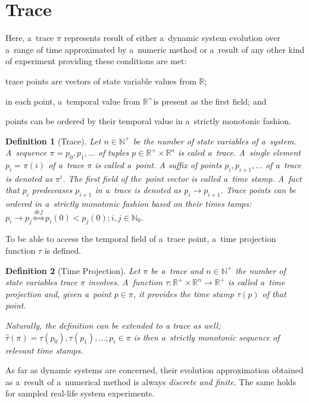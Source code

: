 \documentclass[12pt,oneside,draft]{fithesis}
\newcommand{\mReal}{\mathbb{R}}
\newcommand{\mNatural}{\mathbb{N}}
\newtheorem{mydef}{Definition}
\begin{document}
\section{Trace}
Here, a~trace $\pi$ represents result of either a~dynamic system
evolution over a~range of time\cite{sven}\cite{pospisil} approximated by
a~numeric method or a~result of any other kind of experiment providing
these conditions are met:
\begin{inparaenum}
	\item trace points are vectors of state variable values from
		$\mReal$;
	\item in each point, a~temporal value from $\mReal^+$is present
		as the first field; and
	\item points can be ordered by their temporal value in a~strictly
		monotonic fashion.
\end{inparaenum}
\begin{mydef}[Trace]
Let $n\in\mNatural^+$ be the number of state variables of a~system.
A~sequence $\pi=p_0,p_1,\dotsc$ of tuples $p\in\mReal^+\times\mReal^n$
is caled a~trace. A~single element $p_i=\pi(i)$ of a~trace $\pi$ is
called a~point.
A suffix of points $p_i,p_{i+1},\dotsc$ of a~trace is
denoted as $\pi^i$. The first field of the~point vector is called
a~time stamp.
A~fact that $p_i$ predeceases $p_{i+1}$ in a~trace is denoted as
$p_i\rightarrow p_{i+1}$. Trace points can be ordered in a~strictly
monotonic fashion based on their times tamps:
$p_i\rightarrow p_j\overset{def}{\iff} p_i(0)<p_j(0);i,j\in\mNatural_0$.
\end{mydef}

To be able to access the temporal field of a~trace point,
a~time projection function $\tau$ is defined.
\begin{mydef}[Time Projection]
Let $\pi$ be a~trace and $n\in\mNatural^+$ the number of state
variables trace $\pi$ involves. A~function
$\tau:\mReal^+\times\mReal^n\rightarrow\mReal^+$ is called a~time
projection and, given a~point $p\in\pi$, it provides the time stamp
$\tau(p)$ of that point.

Naturally, the definition can be extended to a trace as well;
$\hat{\tau}(\pi)=\tau(p_0),\tau(p_1),\dotsc;p_i\in\pi$
is then a~strictly monotonic sequence of relevant time stamps.
\end{mydef}

As far as dynamic systems are concerned, their evolution approximation
obtained as a~result of a~numerical method is always \emph{discrete and
finite}. The same holds for sampled real-life system experiments.
\end{document}
